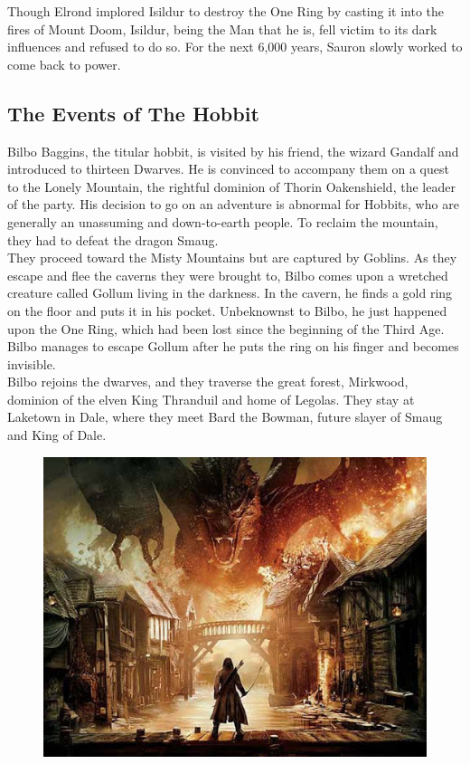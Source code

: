 \documentclass[10pt, letterpaper]{article}
\begin{document}
\noindent Though Elrond implored Isildur to destroy the One Ring by casting it into the fires of Mount Doom, Isildur, being the Man that he is, fell victim to its dark influences and refused to do so. For the next 6,000 years, Sauron slowly worked to come back to power. \\

\subsection{The Events of The Hobbit}

\noindent Bilbo Baggins, the titular hobbit, is visited by his friend, the wizard Gandalf and introduced to thirteen Dwarves. He is convinced to accompany them on a quest to the Lonely Mountain, the rightful dominion of Thorin Oakenshield, the leader of the party. His decision to go on an adventure is abnormal for Hobbits, who are generally an unassuming and down-to-earth people. To reclaim the mountain, they had to defeat the dragon Smaug. \\

\noindent They proceed toward the Misty Mountains but are captured by Goblins. As they escape and flee the caverns they were brought to, Bilbo comes upon a wretched creature called Gollum living in the darkness. In the cavern, he finds a gold ring on the floor and puts it in his pocket. Unbeknownst to Bilbo, he just happened upon the One Ring, which had been lost since the beginning of the Third Age. Bilbo manages to escape Gollum after he puts the ring on his finger and becomes invisible. \\

\noindent Bilbo rejoins the dwarves, and they traverse the great forest, Mirkwood, dominion of the elven King Thranduil and home of Legolas. They stay at Laketown in Dale, where they meet Bard the Bowman, future slayer of Smaug and King of Dale. \\

  \begin{figure}
        \centering
        \includegraphics[scale = 0.35]{image5.png}
    \end{figure}
    
\end{document}
